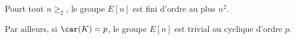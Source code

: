 
\begin{corollaire}
    Pourt tout $n\ge_2$, le groupe $E[n]$ est fini d'ordre au plus $n^2$.

    Par ailleurs, si $\car(K)=p$, le groupe $E[n]$ est trivial ou cyclique d'ordre $p$.
\end{corollaire}

\begin{demonstration}
    
\end{demonstration}
